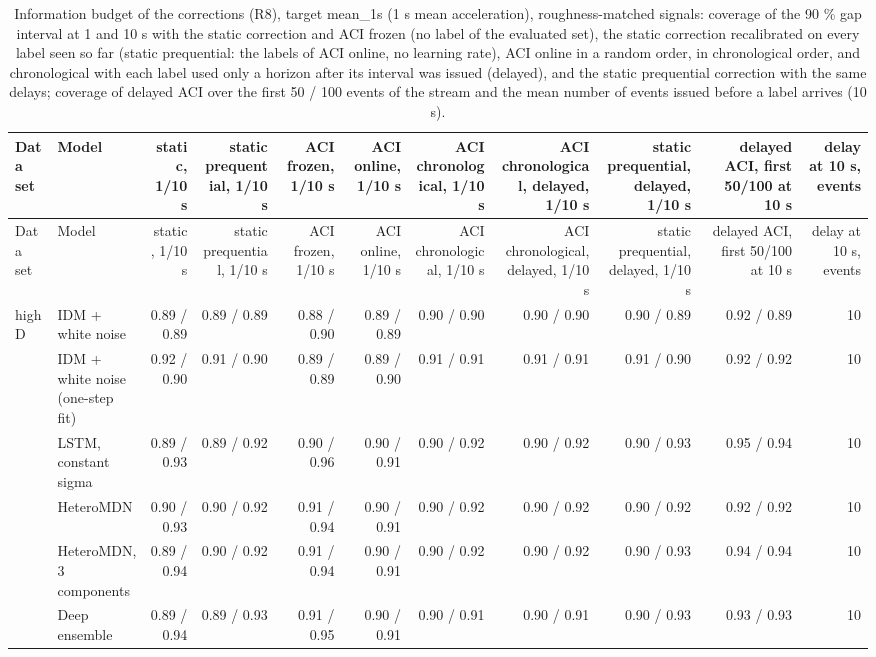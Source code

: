 \begin{longtable}{llrrrrrrrrr}
\caption{Information budget of the corrections (R8), target mean\_1s (1 s mean acceleration), roughness-matched signals: coverage of the 90 \% gap interval at 1 and 10 s with the static correction and ACI frozen (no label of the evaluated set), the static correction recalibrated on every label seen so far (static prequential: the labels of ACI online, no learning rate), ACI online in a random order, in chronological order, and chronological with each label used only a horizon after its interval was issued (delayed), and the static prequential correction with the same delays; coverage of delayed ACI over the first 50 / 100 events of the stream and the mean number of events issued before a label arrives (10 s).}\label{tab:t4-info-budget--matched--mean-1s} \\
\toprule
Data set & Model & static, 1/10 s & static prequential, 1/10 s & ACI frozen, 1/10 s & ACI online, 1/10 s & ACI chronological, 1/10 s & ACI chronological, delayed, 1/10 s & static prequential, delayed, 1/10 s & delayed ACI, first 50/100 at 10 s & delay at 10 s, events \\
\midrule
\endfirsthead
\toprule
Data set & Model & static, 1/10 s & static prequential, 1/10 s & ACI frozen, 1/10 s & ACI online, 1/10 s & ACI chronological, 1/10 s & ACI chronological, delayed, 1/10 s & static prequential, delayed, 1/10 s & delayed ACI, first 50/100 at 10 s & delay at 10 s, events \\
\midrule
\endhead
\bottomrule
\endlastfoot
highD & IDM + white noise & 0.89 / 0.89 & 0.89 / 0.89 & 0.88 / 0.90 & 0.89 / 0.89 & 0.90 / 0.90 & 0.90 / 0.90 & 0.90 / 0.89 & 0.92 / 0.89 & 10 \\
 & IDM + white noise (one-step fit) & 0.92 / 0.90 & 0.91 / 0.90 & 0.89 / 0.89 & 0.89 / 0.90 & 0.91 / 0.91 & 0.91 / 0.91 & 0.91 / 0.90 & 0.92 / 0.92 & 10 \\
 & LSTM, constant sigma & 0.89 / 0.93 & 0.89 / 0.92 & 0.90 / 0.96 & 0.90 / 0.91 & 0.90 / 0.92 & 0.90 / 0.92 & 0.90 / 0.93 & 0.95 / 0.94 & 10 \\
 & HeteroMDN & 0.90 / 0.93 & 0.90 / 0.92 & 0.91 / 0.94 & 0.90 / 0.91 & 0.90 / 0.92 & 0.90 / 0.92 & 0.90 / 0.92 & 0.92 / 0.92 & 10 \\
 & HeteroMDN, 3 components & 0.89 / 0.94 & 0.90 / 0.92 & 0.91 / 0.94 & 0.90 / 0.91 & 0.90 / 0.92 & 0.90 / 0.92 & 0.90 / 0.93 & 0.94 / 0.94 & 10 \\
 & Deep ensemble & 0.89 / 0.94 & 0.89 / 0.93 & 0.91 / 0.95 & 0.90 / 0.91 & 0.90 / 0.91 & 0.90 / 0.91 & 0.90 / 0.93 & 0.93 / 0.93 & 10 \\

\end{longtable}
